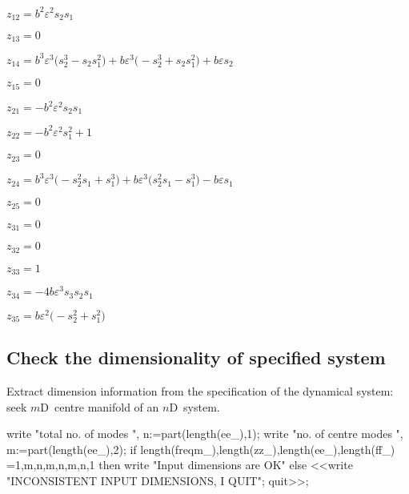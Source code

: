 \documentclass[11pt,a5paper]{article}
\def\eps{\varepsilon}
\begin{document}
\(z_{12}=b^{2} \eps^{2} s_{2} s_{1}
\)\par

\(z_{13}=0
\)\par

\(z_{14}=b^{3} \eps^{3} \big(s_{2}^{3}-s_{2} s_{1}^{2}\big)+b \eps^{3} 
\big(-s_{2}^{3}+s_{2} s_{1}^{2}\big)+b \eps s_{2}
\)\par

\(z_{15}=0
\)\par

\(z_{21}=-b^{2} \eps^{2} s_{2} s_{1}
\)\par

\(z_{22}=-b^{2} \eps^{2} s_{1}^{2}+1
\)\par

\(z_{23}=0
\)\par

\(z_{24}=b^{3} \eps^{3} \big(-s_{2}^{2} s_{1}+s_{1}^{3}\big)+b \eps^{3} 
\big(s_{2}^{2} s_{1}-s_{1}^{3}\big)-b \eps s_{1}
\)\par

\(z_{25}=0
\)\par

\(z_{31}=0
\)\par

\(z_{32}=0
\)\par

\(z_{33}=1
\)\par

\(z_{34}=-4 b \eps^{3} s_{3} s_{2} s_{1}
\)\par

\(z_{35}=b \eps^{2} \big(-s_{2}^{2}+s_{1}^{2}\big)
\)\par

 


\subsection{Check the dimensionality of specified system}
Extract dimension information from the specification of the dynamical system: seek $m$D~centre manifold of an $n$D~system.


\begin{reduce}
write "total no. of modes  ",
n:=part(length(ee_),1);
write "no. of centre modes ",
m:=part(length(ee_),2);
if {length(freqm_),length(zz_),length(ee_),length(ff_)}
  ={{1,m},{n,m},{n,m},{n,1}} 
  then write "Input dimensions are OK" 
  else <<write "INCONSISTENT INPUT DIMENSIONS, I QUIT"; 
      quit>>;
\end{reduce}
\end{document}
